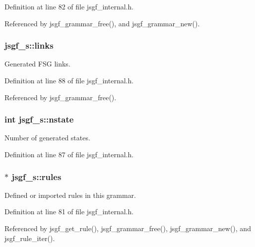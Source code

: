 Definition at line 82 of file jsgf\+\_\+internal.\+h.



Referenced by jsgf\+\_\+grammar\+\_\+free(), and jsgf\+\_\+grammar\+\_\+new().

\subsubsection[{links}]{ jsgf\+\_\+s\+::links}\label{structjsgf__s_a6ee31bac19680f01c413969a75ad838a}


Generated F\+S\+G links. 



Definition at line 88 of file jsgf\+\_\+internal.\+h.



Referenced by jsgf\+\_\+grammar\+\_\+free().

\subsubsection[{nstate}]{\setlength{\rightskip}{0pt plus 5cm}int jsgf\+\_\+s\+::nstate}\label{structjsgf__s_a380c1b82e1bd776438303159e5129773}


Number of generated states. 



Definition at line 87 of file jsgf\+\_\+internal.\+h.

\subsubsection[{rules}]{$\ast$ jsgf\+\_\+s\+::rules}\label{structjsgf__s_af257160279ab56ffca65966aeac18ef9}


Defined or imported rules in this grammar. 



Definition at line 81 of file jsgf\+\_\+internal.\+h.



Referenced by jsgf\+\_\+get\+\_\+rule(), jsgf\+\_\+grammar\+\_\+free(), jsgf\+\_\+grammar\+\_\+new(), and jsgf\+\_\+rule\+\_\+iter().

